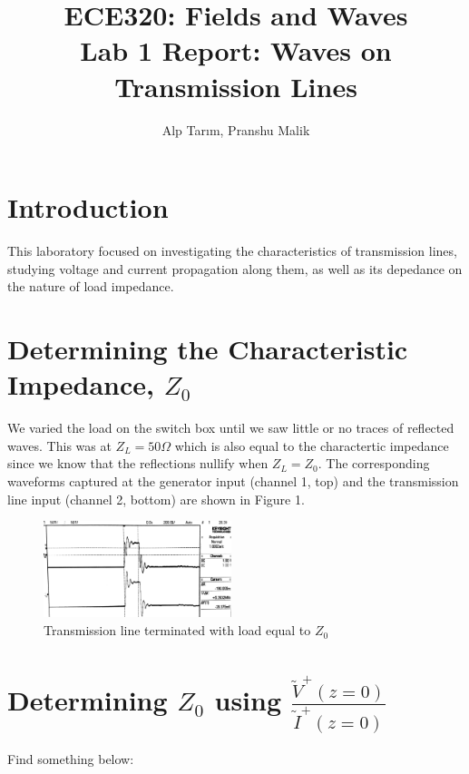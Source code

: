\documentclass[10pt]{article}
\begin{document}
\title{\textbf{\Large{\textsc{ECE320:} Fields and Waves}} \\ \Large{Lab 1 Report: Waves on Transmission Lines}}
\author{Alp Tarım, Pranshu Malik}

\maketitle

\section{Introduction}

This laboratory focused on investigating the characteristics of transmission lines, studying voltage and current 
propagation along them, as well as its depedance on the nature of load impedance.


\section[Determining the Characteristic Impedance, Z0]{Determining the Characteristic Impedance, {$Z_0$}}

We varied the load on the switch box until we saw little or no traces of reflected waves.
This was at $Z_L = 50 \Omega$ which is also equal to the charactertic impedance 
since we know that the reflections nullify when $Z_L = Z_0$. The corresponding waveforms
captured at the generator input (channel 1, top) and the transmission line input (channel 2, bottom) 
are shown in Figure 1.

\begin{figure}[h]
    \centering
    \includegraphics[width=5.49cm]{../photos/lab1/load_matched.jpg}
    \caption{Transmission line terminated with load equal to $Z_0$}
    \label{tline_matching_z_0}
\end{figure}


\section[Determining Z0 using V/I]{Determining $Z_0$ using $\frac{\tilde V^+(z=0)}{\tilde I^+(z=0)}$}

Find something below:
\end{document}
